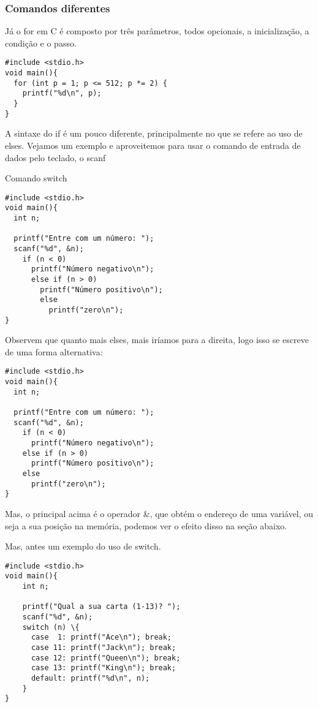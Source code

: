 \documentclass[a4paper]{article}
\begin{document}
\subsubsection{Comandos diferentes}
\label{sec:org17afc7e}
Já o for em C é composto por três parâmetros, todos opcionais,
a inicialização, a condição e o passo.

\begin{verbatim}
#include <stdio.h>
void main(){
  for (int p = 1; p <= 512; p *= 2) {
    printf("%d\n", p);
  }
}   
\end{verbatim}


A sintaxe do if é um pouco diferente, principalmente no que se refere ao
uso de elses. Vejamos um exemplo e aproveitemos para usar o comando de 
entrada de dados pelo teclado, o scanf

Comando switch

\begin{verbatim}
#include <stdio.h>
void main(){
  int n;

  printf("Entre com um número: ");
  scanf("%d", &n);
    if (n < 0)
      printf("Número negativo\n");
      else if (n > 0)
        printf("Número positivo\n");
        else
          printf("zero\n");
}    
\end{verbatim}

Observem que quanto mais elses, mais iríamos para a direita, logo isso
se escreve de uma forma alternativa:

\begin{verbatim}
#include <stdio.h>
void main(){
  int n;

  printf("Entre com um número: ");
  scanf("%d", &n);
    if (n < 0)
      printf("Número negativo\n");
    else if (n > 0)
      printf("Número positivo\n");
    else
      printf("zero\n");
}    
\end{verbatim}


Mas, o principal acima é o operador \&, que obtém o endereço de
uma variável, ou seja a sua posição na memória, podemos ver o efeito
disso na seção abaixo.

Mas, antes um exemplo do uso de switch.

\begin{verbatim}
#include <stdio.h>
void main(){
    int n;

    printf("Qual a sua carta (1-13)? ");
    scanf("%d", &n);
    switch (n) \{
      case  1: printf("Ace\n"); break;
      case 11: printf("Jack\n"); break;
      case 12: printf("Queen\n"); break;
      case 13: printf("King\n"); break;
      default: printf("%d\n", n); 
    }
}
\end{verbatim}
\end{document}

